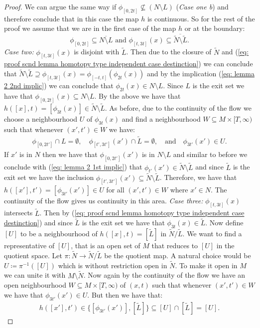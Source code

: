 \begin{proof}
 We can argue the same way if $\phi_{[0,2t]} \not \subseteq  (N\setminus L)$ (\textit{Case one b}) and therefore conclude that in this case the map $h$ is continuous.
So for the rest of the proof we assume that we are in the first case of the map $h$ or at the boundary:
\begin{equation}
\phi_{[0,2t]}\subseteq \overline{N\setminus L} \text{ and } \phi_{[t,3t]}(x)\subseteq \overline{\tilde{N}\setminus \tilde{L}}. \label{eq: proof scnd lemma homotopy type independent case destinction}
\end{equation}
\newline \textit{Case two:} $\phi_{[t,3t]}(x)$ is disjoint with $\tilde{L}$. Then due to the closure of $\tilde{N}$ and (\ref{eq: proof scnd lemma homotopy type independent case destinction}) we can conclude that $\tilde{N}\setminus \tilde{L} \supseteq \phi_{[t,3t]}(x) = \phi_{[-t,t]}(\phi_{2t}(x))$ and by the implication (\ref{eq: lemma 2 2nd implic}) we can conclude that $\phi_{2t}(x) \in N\setminus L$. Since $L$ is the exit set we have that $\phi_{[0,2t]}(x)\subseteq N \setminus L$. By the above we have that $h([x],t)=[\phi_{3t}(x)]\in \tilde{N}\setminus \tilde{L}$. As before, due to the continuity of the flow we choose a neighbourhood $U$ of $\phi_{3t}(x)$ and find a neighbourhood $W\subseteq M \times [T,\infty)$ such that whenever $(x',t')\in W$ we have:
\begin{align*}
\phi_{[0,2t']}\cap L=\emptyset, \quad \phi_{[t',3t']}(x')\cap \tilde{L}=\emptyset, \quad \text{and} \quad \phi_{3t'}(x')\in U.
\end{align*}
If $x'$ is in $N$ then we have that $\phi_{[0,2t']}(x')$ is in $N\setminus L$ and similar to before we conclude with (\ref{eq: lemma 2 1st implic}) that $\phi_{t'}(x')\in \tilde{N}\setminus \tilde{L}$ and since $\tilde{L}$ is the exit set we have the inclusion ${\phi_{[t',3t']}(x')\subseteq \tilde{N} \setminus \tilde{L}}$. Therefore, we have that $h([x'],t')=[\phi_{3t'}(x')] \in U$ for all $(x',t')\in W$ where $x'\in N$. The continuity of the flow gives us continuity in this area.
\newline \textit{Case three:} $\phi_{[t,3t]}(x)$ intersects $\tilde{L}$. Then by (\ref{eq: proof scnd lemma homotopy type independent case destinction}) and since $\tilde{L}$ is the exit set we have that $\phi_{3t}(x)\in \tilde{L}$. 
Now define $[U]$ to be a neighbourhood of $h([x],t)=[\tilde{L}]$ in $\tilde{N}/\tilde{L}$. We want to find a representative of $[U]$, that is an open set of $M$ that reduces to $[U]$ in the quotient space. Let $\pi:\tilde{N}\to \tilde{N}/\tilde{L}$ be the quotient map. A natural choice would be 
$U\coloneq \pi^{-1}([U])$ which is without restriction open in $\tilde{N}$. To make it open in $M$ we can unite it with $M\setminus \tilde{N}$. Now again by the continuity of the flow we have an open neighbourhood $W\subseteq M\times [T,\infty)$ of $(x,t)$ such that whenever $(x',t')\in W$ we have that $\phi_{3t'}(x')\in U$. But then we have that:
\begin{align*}
h([x'],t')\in \{ [\phi_{3t'}(x')],[\tilde{L}] \} \subseteq [U] \cap [\tilde{L}]=[U].
\end{align*}
\end{proof}


